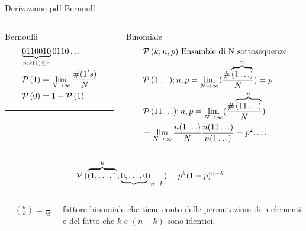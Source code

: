 \documentclass[asd-beamer.tex]{subfiles}%
\begin{document}
\begin{wordonframe}{Derivazione pdf Bernoulli}
\begin{columns}[T]
\begin{column}{0.3\textwidth}
\begin{block}{Bernoulli}
\begin{align*}
&\underbrace{0110010}_{n:k(1)\leq n}0110\ldots\\
&\operatorname{\mathcal{P}}{(1)}=\lim_{N\to\infty}\frac{\#(1's)}{N}\\
&\operatorname{\mathcal{P}}{(0)}=1-\operatorname{\mathcal{P}}{(1)}\\
\end{align*}
\noindent\rule{0.9\textwidth}{0.4pt}
\end{block}
\end{column}
\begin{column}{0.7\textwidth}
\begin{block}{Binomiale}
\begin{align*}
&\operatorname{\mathcal{P}}{(k;n,p)}\ \text{Ensamble di N sottosequenze}\\
&\operatorname{\mathcal{P}}{(1\ldots);n,p}=\lim_{N\to\infty}(\frac{\#\overbrace{(1\ldots)}^n}{N})=p\\
&\operatorname{\mathcal{P}}{(11\ldots);n,p}=\lim_{N\to\infty}(\frac{\#\overbrace{(11\ldots)}^n}{N})\\
&=\lim_{N\to\infty}\frac{n(1\ldots)}{N}\frac{n(11\ldots)}{n(1\ldots)}=p^2, \ldots
\end{align*}
\end{block}
\end{column}
\end{columns}
\begin{align*}
&\operatorname{\mathcal{P}}{(\overbrace{(1,\ldots,1}^k,\underbrace{0,\ldots,0})}_{n-k})=p^k(1-p)^{n-k}
\end{align*}
\begin{columns}[T]
\begin{column}{0.2\textwidth}
\begin{align*}
&\binom{n}{k}=\frac{n!}{k!(n-k)!}
\end{align*}
\end{column}
\begin{column}{0.8\textwidth}
fattore binomiale che tiene conto delle permutazioni di n elementi e del fatto che $k$ e $(n-k)$ sono identici.
\end{column}
\end{columns}
\end{wordonframe}
\end{document}
